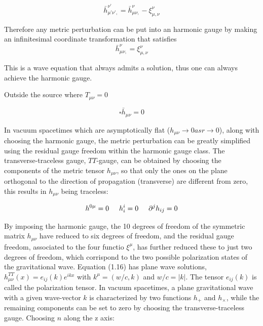 \documentclass[binding=0.6cm, LaM]{sapthesis}
\begin{document}
\begin{equation}
{\bar h}_{\mu’\nu’,} ^{\nu’} = {\bar h}_{\mu\nu,} ^{\nu} - \xi_{\mu,\nu}^{\nu}
\end{equation}

Therefore any metric perturbation can be put into an harmonic gauge by making an infinitesimal coordinate transformation that satisfies 
\begin{equation}
{\bar h}_{\mu\nu,} ^{\nu} = \xi_{\mu,\nu}^{\nu}
\end{equation}

This is a wave equation that always admits a solution, thus one can always achieve the harmonic gauge. 

Outside the source where $T_{\mu\nu} = 0$ 

\begin{equation}
\square {\bar h}_{\mu\nu} = 0
\end{equation}

In vacuum spacetimes which are asymptotically flat ($h_{\mu\nu} \rightarrow 0 as r \rightarrow 0$), along with choosing the harmonic gauge, the metric perturbation can be greatly simplified using the residual gauge freedom within the harmonic gauge class. The transverse-traceless gauge,  $TT$-gauge, can be obtained by choosing the components of the metric tensor $h_{\mu\nu}$, so that only the ones on the plane orthogonal to the direction of propagation (transverse) are different from zero, this results in $h_{\mu\nu}$ being traceless:

\begin{equation}
h^{0\mu} = 0 \hspace*{0.5cm}  h^{i}_i = 0  \hspace*{0.5cm}   {\partial}^jh_{ij} = 0
\end{equation}

By imposing the harmonic gauge, the 10 degrees of freedom of the symmetric matrix $h_{\mu\nu}$ have reduced to six degrees of freedom, and the residual gauge freedom, associated to the four functio $\xi^{\mu}$, has further reduced these to just two degrees of freedom, which corrispond to the two possible polarization states of the gravitational wave. 
Equation (1.16) has plane wave solutions, $h_{\mu\nu}^{TT}(x)=e_{ij}(k)e^{ikx}$ with $k^{\mu}=(w/c,k)$ and $w/c=|k|$. The tensor $e_{ij}(k)$ is called the polarization tensor. In vacuum spacetimes, a plane gravitational wave with a given wave-vector $k$ is characterized by two functions $h_+$ and $h_{\times}$, while the remaining components can be set to zero by choosing the transverse-traceless gauge. Choosing $n$ along the z axis:
\end{document}
